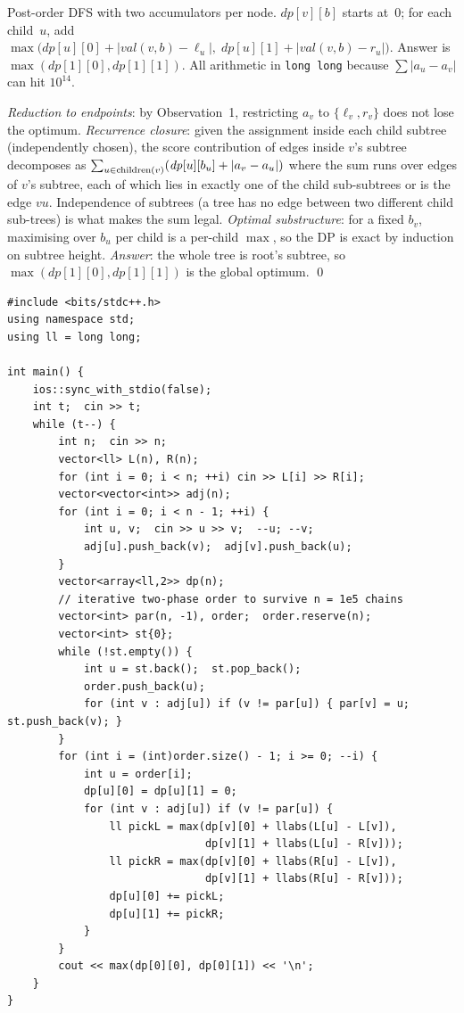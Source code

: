 Post-order DFS with two accumulators per node. $\mathit{dp}[v][b]$ starts
at~$0$; for each child~$u$, add
$\max\!\big(\mathit{dp}[u][0]+|\mathit{val}(v,b)-\ell_u|,\;\mathit{dp}[u][1]+|\mathit{val}(v,b)-r_u|\big)$.
Answer is $\max(\mathit{dp}[1][0],\mathit{dp}[1][1])$. All arithmetic in
\lstinline{long long} because $\sum|a_u-a_v|$ can hit $10^{14}$.

\begin{proofbox}
\emph{Reduction to endpoints}: by Observation~1, restricting $a_v$ to
$\{\ell_v,r_v\}$ does not lose the optimum. \emph{Recurrence closure}:
given the assignment inside each child subtree (independently chosen), the
score contribution of edges inside $v$'s subtree decomposes as
$\sum_{u\in\operatorname{children}(v)}(\mathit{dp}[u][b_u] + |a_v-a_u|)$ where the sum
runs over edges of $v$'s subtree, each of which lies in exactly one of the
child sub-subtrees or is the edge $vu$. Independence of subtrees (a tree
has no edge between two different child sub-trees) is what makes the sum
legal. \emph{Optimal substructure}: for a fixed $b_v$, maximising over
$b_u$ per child is a per-child $\max$, so the DP is exact by induction on
subtree height. \emph{Answer}: the whole tree is root's subtree, so
$\max(\mathit{dp}[1][0],\mathit{dp}[1][1])$ is the global optimum. \qed
\end{proofbox}

\begin{lstlisting}[caption={CF 1529C -- endpoint reduction plus in/out pair; \coderef{c10-inout}'s skeleton with a per-edge weight matrix}, label={lst:c10-1529c-soln}]
#include <bits/stdc++.h>
using namespace std;
using ll = long long;

int main() {
    ios::sync_with_stdio(false);
    int t;  cin >> t;
    while (t--) {
        int n;  cin >> n;
        vector<ll> L(n), R(n);
        for (int i = 0; i < n; ++i) cin >> L[i] >> R[i];
        vector<vector<int>> adj(n);
        for (int i = 0; i < n - 1; ++i) {
            int u, v;  cin >> u >> v;  --u; --v;
            adj[u].push_back(v);  adj[v].push_back(u);
        }
        vector<array<ll,2>> dp(n);
        // iterative two-phase order to survive n = 1e5 chains
        vector<int> par(n, -1), order;  order.reserve(n);
        vector<int> st{0};
        while (!st.empty()) {
            int u = st.back();  st.pop_back();
            order.push_back(u);
            for (int v : adj[u]) if (v != par[u]) { par[v] = u; st.push_back(v); }
        }
        for (int i = (int)order.size() - 1; i >= 0; --i) {
            int u = order[i];
            dp[u][0] = dp[u][1] = 0;
            for (int v : adj[u]) if (v != par[u]) {
                ll pickL = max(dp[v][0] + llabs(L[u] - L[v]),
                               dp[v][1] + llabs(L[u] - R[v]));
                ll pickR = max(dp[v][0] + llabs(R[u] - L[v]),
                               dp[v][1] + llabs(R[u] - R[v]));
                dp[u][0] += pickL;
                dp[u][1] += pickR;
            }
        }
        cout << max(dp[0][0], dp[0][1]) << '\n';
    }
}
\end{lstlisting}

